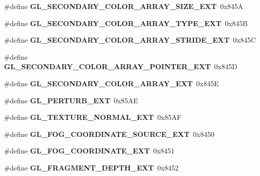 \begin{DoxyCompactItemize}
\item 
\#define {\bfseries G\+L\+\_\+\+S\+E\+C\+O\+N\+D\+A\+R\+Y\+\_\+\+C\+O\+L\+O\+R\+\_\+\+A\+R\+R\+A\+Y\+\_\+\+S\+I\+Z\+E\+\_\+\+E\+X\+T}~0x845\+A\label{_s_d_l__opengl_8h_a085c2d30ca3ae534f507e70ed9d890ed}

\item 
\#define {\bfseries G\+L\+\_\+\+S\+E\+C\+O\+N\+D\+A\+R\+Y\+\_\+\+C\+O\+L\+O\+R\+\_\+\+A\+R\+R\+A\+Y\+\_\+\+T\+Y\+P\+E\+\_\+\+E\+X\+T}~0x845\+B\label{_s_d_l__opengl_8h_add02ad61bdb6dc5b806a87589b9a9ba3}

\item 
\#define {\bfseries G\+L\+\_\+\+S\+E\+C\+O\+N\+D\+A\+R\+Y\+\_\+\+C\+O\+L\+O\+R\+\_\+\+A\+R\+R\+A\+Y\+\_\+\+S\+T\+R\+I\+D\+E\+\_\+\+E\+X\+T}~0x845\+C\label{_s_d_l__opengl_8h_a6240ac627c340d7c4f912734a301be73}

\item 
\#define {\bfseries G\+L\+\_\+\+S\+E\+C\+O\+N\+D\+A\+R\+Y\+\_\+\+C\+O\+L\+O\+R\+\_\+\+A\+R\+R\+A\+Y\+\_\+\+P\+O\+I\+N\+T\+E\+R\+\_\+\+E\+X\+T}~0x845\+D\label{_s_d_l__opengl_8h_a997871c1859e7d7719db28effdd3faeb}

\item 
\#define {\bfseries G\+L\+\_\+\+S\+E\+C\+O\+N\+D\+A\+R\+Y\+\_\+\+C\+O\+L\+O\+R\+\_\+\+A\+R\+R\+A\+Y\+\_\+\+E\+X\+T}~0x845\+E\label{_s_d_l__opengl_8h_ae8308c039d6cc3fc16ca16ef1f6b6a66}

\item 
\#define {\bfseries G\+L\+\_\+\+P\+E\+R\+T\+U\+R\+B\+\_\+\+E\+X\+T}~0x85\+A\+E\label{_s_d_l__opengl_8h_ab6e1381c3024409d936aceb303f64512}

\item 
\#define {\bfseries G\+L\+\_\+\+T\+E\+X\+T\+U\+R\+E\+\_\+\+N\+O\+R\+M\+A\+L\+\_\+\+E\+X\+T}~0x85\+A\+F\label{_s_d_l__opengl_8h_a09e349d32810af52238ac4743fd9242c}

\item 
\#define {\bfseries G\+L\+\_\+\+F\+O\+G\+\_\+\+C\+O\+O\+R\+D\+I\+N\+A\+T\+E\+\_\+\+S\+O\+U\+R\+C\+E\+\_\+\+E\+X\+T}~0x8450\label{_s_d_l__opengl_8h_a1de88d33778a83c513a154e2eb18ead3}

\item 
\#define {\bfseries G\+L\+\_\+\+F\+O\+G\+\_\+\+C\+O\+O\+R\+D\+I\+N\+A\+T\+E\+\_\+\+E\+X\+T}~0x8451\label{_s_d_l__opengl_8h_a80cc7ad341d1c8745e57c22477ef2b88}

\item 
\#define {\bfseries G\+L\+\_\+\+F\+R\+A\+G\+M\+E\+N\+T\+\_\+\+D\+E\+P\+T\+H\+\_\+\+E\+X\+T}~0x8452\label{_s_d_l__opengl_8h_a446b854752bbe34f89679d7e98ca5e84}


\end{DoxyCompactItemize}
